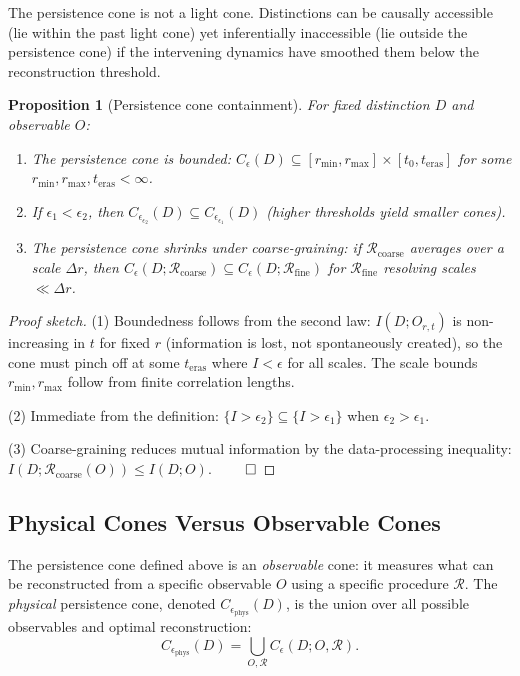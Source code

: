 \documentclass[12pt,a4paper,twoside,openright]{book}
\theoremstyle{plain}
\newtheorem{proposition}[theorem]{Proposition}
\theoremstyle{definition}
\theoremstyle{remark}
\newcommand{\Pcone}{C_\epsilon}
\begin{document}
The persistence cone is not a light cone. Distinctions can be causally accessible (lie within the past light cone) yet inferentially inaccessible (lie outside the persistence cone) if the intervening dynamics have smoothed them below the reconstruction threshold.

\begin{proposition}[Persistence cone containment]
For fixed distinction $D$ and observable $O$:
\begin{enumerate}
\item The persistence cone is bounded: $\Pcone(D) \subseteq [r_{\min}, r_{\max}] \times [t_0, t_{\mathrm{eras}}]$ for some $r_{\min}, r_{\max}, t_{\mathrm{eras}} < \infty$.
\item If $\epsilon_1 < \epsilon_2$, then $\Pcone_{\epsilon_2}(D) \subseteq \Pcone_{\epsilon_1}(D)$ (higher thresholds yield smaller cones).
\item The persistence cone shrinks under coarse-graining: if $\mathcal{R}_{\mathrm{coarse}}$ averages over a scale $\Delta r$, then $\Pcone(D; \mathcal{R}_{\mathrm{coarse}}) \subseteq \Pcone(D; \mathcal{R}_{\mathrm{fine}})$ for $\mathcal{R}_{\mathrm{fine}}$ resolving scales $\ll \Delta r$.
\end{enumerate}
\end{proposition}

\begin{proof}[Proof sketch]
(1) Boundedness follows from the second law: $I(D; O_{r,t})$ is non-increasing in $t$ for fixed $r$ (information is lost, not spontaneously created), so the cone must pinch off at some $t_{\mathrm{eras}}$ where $I < \epsilon$ for all scales. The scale bounds $r_{\min}, r_{\max}$ follow from finite correlation lengths.

(2) Immediate from the definition: $\{I > \epsilon_2\} \subseteq \{I > \epsilon_1\}$ when $\epsilon_2 > \epsilon_1$.

(3) Coarse-graining reduces mutual information by the data-processing inequality: $I(D; \mathcal{R}_{\mathrm{coarse}}(O)) \leq I(D; O)$. $\qed$
\end{proof}

\subsection{Physical Cones Versus Observable Cones}

The persistence cone defined above is an \emph{observable} cone: it measures what can be reconstructed from a specific observable $O$ using a specific procedure $\mathcal{R}$. The \emph{physical} persistence cone, denoted $\Pcone_{\mathrm{phys}}(D)$, is the union over all possible observables and optimal reconstruction:
\[
\Pcone_{\mathrm{phys}}(D) = \bigcup_{O, \mathcal{R}} \Pcone(D; O, \mathcal{R}).
\]
\end{document}
